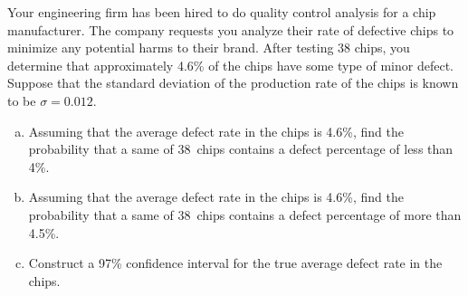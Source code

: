 \documentclass[11pt,letterpaper]{article}
\begin{document}

 Your engineering firm has been hired to do quality control analysis for a chip manufacturer. The company requests you analyze their rate of defective chips to minimize any potential harms to their brand. After testing 38 chips, you determine that approximately 4.6\% of the chips have some type of minor defect. Suppose that the standard deviation of the production rate of the chips is known to be $\sigma= 0.012$. 
	\begin{enumerate}[(a)]
	\item Assuming that the average defect rate in the chips is 4.6\%, find the probability that a same of 38~chips contains a defect percentage of less than 4\%.
	 \item Assuming that the average defect rate in the chips is 4.6\%, find the probability that a same of 38~chips contains a defect percentage of more than 4.5\%. 
	 \item Construct a 97\% confidence interval for the true average defect rate in the chips. 
	\end{enumerate}



\newpage



\end{document}
